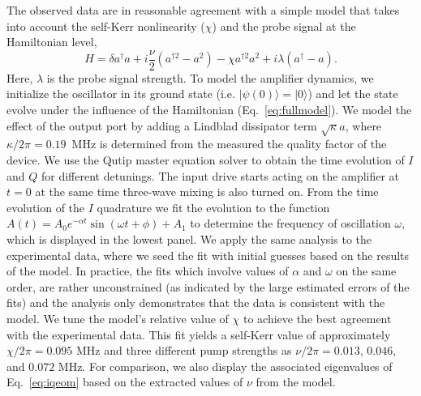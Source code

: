 \documentclass[prl,twocolumn,english,superscriptaddress,floatfix,longbibliography]{revtex4-2}
\newcommand{\braketmatrix}[3]{\left \langle #1 \middle| #2 \middle| #3 \right \rangle}
\newcommand{\ket}[1]{|#1\rangle}
\begin{document}
  The observed data are in reasonable agreement with a simple model that takes into account the self-Kerr nonlinearity ($\chi$) and the probe signal at the Hamiltonian level,
\begin{equation}
    H = \delta a^{\dagger}a + i \frac{\nu}{2}(a^{\dagger 2}-a^{2})- \chi a^{\dagger 2}a^{2} +i \lambda(a^{\dagger}-a). \label{eq:fullmodel}
\end{equation}
Here, $\lambda$ is the probe signal strength. To model the amplifier dynamics, we initialize the oscillator in its ground state (i.e. $\ket{\psi (0)} = \ket{0}$) and let the state evolve under the influence of the Hamiltonian (Eq.~\ref{eq:fullmodel}). We model the effect of the output port by adding a Lindblad dissipator term $\sqrt{\kappa} a$, where $\kappa/2\pi =0.19$~MHz is determined from the measured the quality factor of the device. We use the Qutip \cite{Johansson2012,Johansson2013} master equation solver to obtain the time evolution of $I$ and $Q$ for different detunings. The input drive starts acting on the amplifier at $t=0$ at the same time three-wave mixing is also turned on. From the time evolution of the $I$ quadrature we fit the evolution to the function $A(t) = A_0 e^{-\alpha t}\sin(\omega t +\phi) + A_1$ to determine the frequency of oscillation $\omega$, which is displayed in the lowest panel. We apply the same analysis to the experimental data, where we seed the fit with initial guesses based on the results of the model. In practice, the fits which involve values of $\alpha$ and $\omega$ on the same order, are rather unconstrained (as indicated by the large estimated errors of the fits) and the analysis only demonstrates that the data is consistent with the model. We tune the model's  relative value of $\chi$ to achieve the best agreement with the experimental data. This fit yields a self-Kerr value of approximately $\chi / 2\pi =  0.095$ MHz and three different pump strengths as $\nu /2 \pi = 0.013$, $0.046$, and $0.072$ MHz. For comparison, we also display the associated eigenvalues of Eq.~\ref{eq:iqeom} based on the extracted values of $\nu$ from the model.   %
\end{document}
